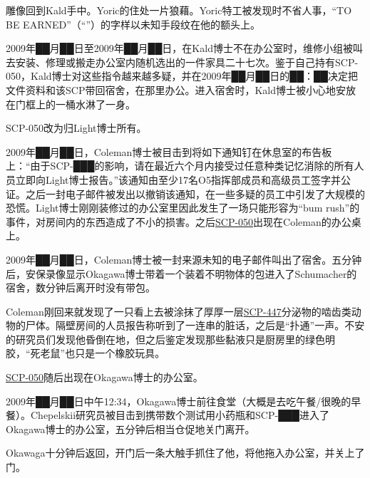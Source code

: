 

雕像回到Kald手中。Yoric的住处一片狼藉。Yoric特工被发现时不省人事，“TO BE EARNED”（“”）的字样以未知手段纹在他的额头上。



2009年██月██日至2009年██月██日，在Kald博士不在办公室时，维修小组被叫去安装、修理或搬走办公室内随机选出的一件家具二十七次。鉴于自己持有SCP-050，Kald博士对这些指令越来越多疑，并在2009年██月██日的██：██决定把文件资料和该SCP带回宿舍，在那里办公。进入宿舍时，Kald博士被小心地安放在门框上的一桶水淋了一身。

SCP-050改为归Light博士所有。



2009年██月██日，Coleman博士被目击到将如下通知钉在休息室的布告板上：“由于SCP-███的影响，请在最近六个月内接受过任意种类记忆消除的所有人员立即向Light博士报告。”该通知由至少17名O5指挥部成员和高级员工签字并公证。之后一封电子邮件被发出以撤销该通知，在一些多疑的员工中引发了大规模的恐慌。Light博士刚刚装修过的办公室里因此发生了一场只能形容为“bum rush”的事件，对房间内的东西造成了不小的损害。之后\hyperref[chap:SCP-050]{SCP-050}出现在Coleman的办公桌上。



2009年██月██日，Coleman博士被一封来源未知的电子邮件叫出了宿舍。五分钟后，安保录像显示Okagawa博士带着一个装着不明物体的包进入了Schumacher的宿舍，数分钟后离开时没有带包。

Coleman刚回来就发现了一只看上去被涂抹了厚厚一层\hyperref[chap:SCP-447]{SCP-447}分泌物的啮齿类动物的尸体。隔壁房间的人员报告称听到了一连串的脏话，之后是“扑通”一声。不安的研究员们发现他昏倒在地，但之后鉴定发现那些黏液只是厨房里的绿色明胶，“死老鼠”也只是一个橡胶玩具。

\hyperref[chap:SCP-050]{SCP-050}随后出现在Okagawa博士的办公室。



2009年██月██日中午12:34，Okagawa博士前往食堂（大概是去吃午餐\slash 很晚的早餐）。Chepelskii研究员被目击到携带数个测试用小药瓶和SCP-███进入了Okagawa博士的办公室，五分钟后相当仓促地关门离开。

Okawaga十分钟后返回，开门后一条大触手抓住了他，将他拖入办公室，并关上了门。

